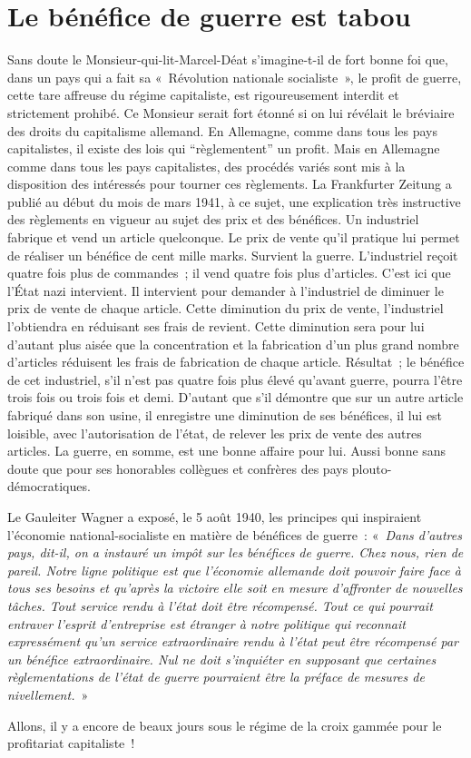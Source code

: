 \documentclass[french,twoside]{book} %
\begin{document}
\section[{Le bénéfice de guerre est tabou}]{Le bénéfice de guerre est tabou}
\noindent Sans doute le Monsieur-qui-lit-Marcel-Déat s’imagine-t-il de fort bonne foi que, dans un pays qui a fait sa « Révolution nationale socialiste », le profit de guerre, cette tare affreuse du régime capitaliste, est rigoureusement interdit et strictement prohibé. Ce Monsieur serait fort étonné si on lui révélait le bréviaire des droits du capitalisme allemand. En Allemagne, comme dans tous les pays capitalistes, il existe des lois qui “règlementent” un profit. Mais en Allemagne comme dans tous les pays capitalistes, des procédés variés sont mis à la disposition des intéressés pour tourner ces règlements. La Frankfurter Zeitung a publié au début du mois de mars 1941, à ce sujet, une explication très instructive des règlements en vigueur au sujet des prix et des bénéfices. Un industriel fabrique et vend un article quelconque. Le prix de vente qu’il pratique lui permet de réaliser un bénéfice de cent mille marks. Survient la guerre. L’industriel reçoit quatre fois plus de commandes ; il vend quatre fois plus d’articles. C’est ici que l’État nazi intervient. Il intervient pour demander à l’industriel de diminuer le prix de vente de chaque article. Cette diminution du prix de vente, l’industriel l’obtiendra en réduisant ses frais de revient. Cette diminution sera pour lui d’autant plus aisée que la concentration et la fabrication d’un plus grand nombre d’articles réduisent les frais de fabrication de chaque article. Résultat ; le bénéfice de cet industriel, s’il n’est pas quatre fois plus élevé qu’avant guerre, pourra l’être trois fois ou trois fois et demi. D’autant que s’il démontre que sur un autre article fabriqué dans son usine, il enregistre une diminution de ses bénéfices, il lui est loisible, avec l’autorisation de l’état, de relever les prix de vente des autres articles. La guerre, en somme, est une bonne affaire pour lui. Aussi bonne sans doute que pour ses honorables collègues et confrères des pays plouto-démocratiques.\par
Le Gauleiter Wagner a exposé, le 5 août 1940, les principes qui inspiraient l’économie national-socialiste en matière de bénéfices de guerre : « \emph{Dans d’autres pays, dit-il, on a instauré un impôt sur les bénéfices de guerre. Chez nous, rien de pareil. Notre ligne politique est que l’économie allemande doit pouvoir faire face à tous ses besoins et qu’après la victoire elle soit en mesure d’affronter de nouvelles tâches. Tout service rendu à l’état doit être récompensé. Tout ce qui pourrait entraver l’esprit d’entreprise est étranger à notre politique qui reconnait expressément qu’un service extraordinaire rendu à l’état peut être récompensé par un bénéfice extraordinaire. Nul ne doit s’inquiéter en supposant que certaines règlementations de l’état de guerre pourraient être la préface de mesures de nivellement.} »\par
Allons, il y a encore de beaux jours sous le régime de la croix gammée pour le profitariat capitaliste !
\end{document}
